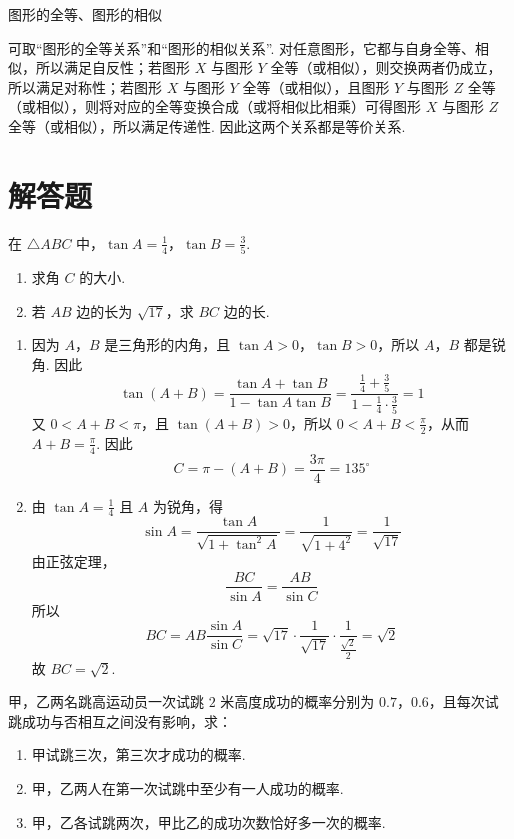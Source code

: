 \begin{answer}
\(\text{图形的全等、图形的相似}\)
\end{answer}

\begin{solution}
可取“图形的全等关系”和“图形的相似关系”. 对任意图形，它都与自身全等、相似，所以满足自反性；若图形 \(X\) 与图形 \(Y\) 全等（或相似），则交换两者仍成立，所以满足对称性；若图形 \(X\) 与图形 \(Y\) 全等（或相似），且图形 \(Y\) 与图形 \(Z\) 全等（或相似），则将对应的全等变换合成（或将相似比相乘）可得图形 \(X\) 与图形 \(Z\) 全等（或相似），所以满足传递性. 因此这两个关系都是等价关系.
\end{solution}

\section{解答题}

\begin{problem}
在 \(\triangle ABC\) 中，\(\tan A = \frac{1}{4}\)，\(\tan B = \frac{3}{5}\).

\begin{enumerate}
\item 求角 \(C\) 的大小.
\item 若 \(AB\) 边的长为 \(\sqrt{17}\)，求 \(BC\) 边的长.
\end{enumerate}
\end{problem}

\begin{solution}
\begin{enumerate}
\item 因为 \(A\)，\(B\) 是三角形的内角，且 \(\tan A>0\)，\(\tan B>0\)，所以 \(A\)，\(B\) 都是锐角. 因此
\[
\tan(A+B)=\frac{\tan A+\tan B}{1-\tan A\tan B}
 =\frac{\frac14+\frac35}{1-\frac14\cdot\frac35}=1
\]
又 \(0<A+B<\pi\)，且 \(\tan(A+B)>0\)，所以 \(0<A+B<\frac{\pi}{2}\)，从而 \(A+B=\frac{\pi}{4}\). 因此
\[
C=\pi-(A+B)=\frac{3\pi}{4}=135^{\circ}
\]
\item 由 \(\tan A=\frac14\) 且 \(A\) 为锐角，得
\[
\sin A=\frac{\tan A}{\sqrt{1+\tan^2 A}}=\frac{1}{\sqrt{1+4^{2}}}=\frac{1}{\sqrt{17}}
\]
由正弦定理，
\[
\frac{BC}{\sin A}=\frac{AB}{\sin C}
\]
所以
\[
BC=AB\frac{\sin A}{\sin C}
 =\sqrt{17}\cdot\frac{1}{\sqrt{17}}\cdot\frac{1}{\frac{\sqrt{2}}{2}}
 =\sqrt{2}
\]
故 \(BC=\sqrt{2}\).
\end{enumerate}
\end{solution}

\begin{problem}
甲，乙两名跳高运动员一次试跳 \(2\) 米高度成功的概率分别为 \(0.7\)，\(0.6\)，且每次试跳成功与否相互之间没有影响，求：

\begin{enumerate}
\item 甲试跳三次，第三次才成功的概率.
\item 甲，乙两人在第一次试跳中至少有一人成功的概率.
\item 甲，乙各试跳两次，甲比乙的成功次数恰好多一次的概率.
\end{enumerate}
\end{problem}

